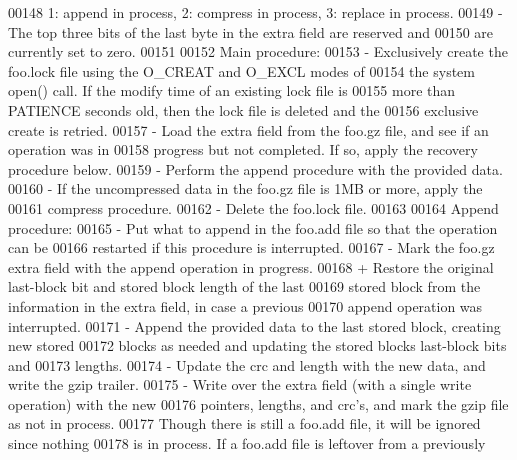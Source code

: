 \begin{DoxyCode}
00148 \textcolor{comment}{     1: append in process, 2: compress in process, 3: replace in process.}
00149 \textcolor{comment}{   - The top three bits of the last byte in the extra field are reserved and}
00150 \textcolor{comment}{     are currently set to zero.}
00151 \textcolor{comment}{}
00152 \textcolor{comment}{   Main procedure:}
00153 \textcolor{comment}{   - Exclusively create the foo.lock file using the O\_CREAT and O\_EXCL modes of}
00154 \textcolor{comment}{     the system open() call.  If the modify time of an existing lock file is}
00155 \textcolor{comment}{     more than PATIENCE seconds old, then the lock file is deleted and the}
00156 \textcolor{comment}{     exclusive create is retried.}
00157 \textcolor{comment}{   - Load the extra field from the foo.gz file, and see if an operation was in}
00158 \textcolor{comment}{     progress but not completed.  If so, apply the recovery procedure below.}
00159 \textcolor{comment}{   - Perform the append procedure with the provided data.}
00160 \textcolor{comment}{   - If the uncompressed data in the foo.gz file is 1MB or more, apply the}
00161 \textcolor{comment}{     compress procedure.}
00162 \textcolor{comment}{   - Delete the foo.lock file.}
00163 \textcolor{comment}{}
00164 \textcolor{comment}{   Append procedure:}
00165 \textcolor{comment}{   - Put what to append in the foo.add file so that the operation can be}
00166 \textcolor{comment}{     restarted if this procedure is interrupted.}
00167 \textcolor{comment}{   - Mark the foo.gz extra field with the append operation in progress.}
00168 \textcolor{comment}{   + Restore the original last-block bit and stored block length of the last}
00169 \textcolor{comment}{     stored block from the information in the extra field, in case a previous}
00170 \textcolor{comment}{     append operation was interrupted.}
00171 \textcolor{comment}{   - Append the provided data to the last stored block, creating new stored}
00172 \textcolor{comment}{     blocks as needed and updating the stored blocks last-block bits and}
00173 \textcolor{comment}{     lengths.}
00174 \textcolor{comment}{   - Update the crc and length with the new data, and write the gzip trailer.}
00175 \textcolor{comment}{   - Write over the extra field (with a single write operation) with the new}
00176 \textcolor{comment}{     pointers, lengths, and crc's, and mark the gzip file as not in process.}
00177 \textcolor{comment}{     Though there is still a foo.add file, it will be ignored since nothing}
00178 \textcolor{comment}{     is in process.  If a foo.add file is leftover from a previously}

\end{DoxyCode}
